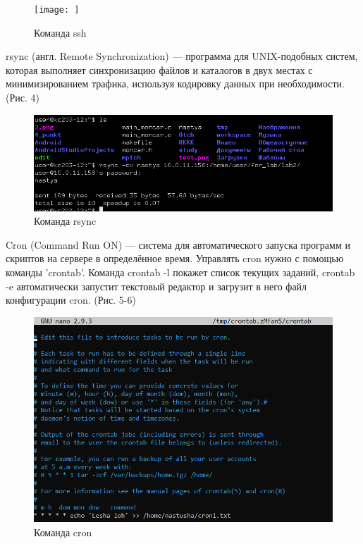 \documentclass[a4paper,14pt]{extarticle}
\begin{document}
\begin{figure}[h!]
\centering
\texttt{[image: ]}
\caption{Команда ssh}
\label{fig:mpr}
\end{figure}

rsync (англ. Remote Synchronization) — программа для UNIX-подобных систем, которая выполняет синхронизацию файлов и каталогов в двух местах с минимизированием трафика, используя кодировку данных при необходимости. (Рис. 4)

\begin{figure}[h!]
\centering
\includegraphics[width=1\linewidth]{rsync.png}
\caption{Команда rsync}
\label{fig:mpr}
\end{figure}

Cron (Command Run ON) — система для автоматического запуска программ и скриптов на сервере в определённое время. Управлять cron нужно с помощью команды 'crontab'. Команда crontab -l покажет список текущих заданий, crontab -e автоматически запустит текстовый редактор и загрузит в него файл конфигурации cron. (Рис. 5-6)

\begin{figure}[h!]
\centering
\includegraphics[width=1\linewidth]{cron2.png}
\caption{Команда cron}
\label{fig:mpr}
\end{figure}
\end{document}
